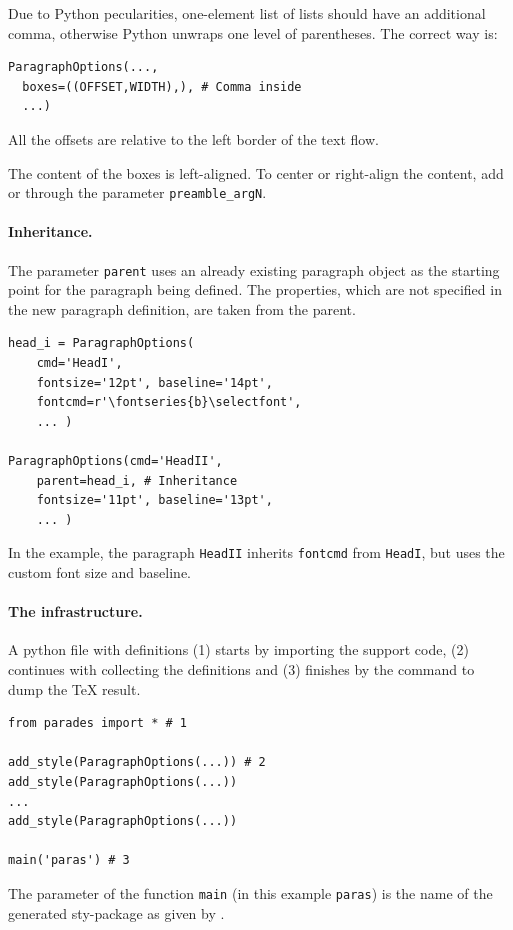 \documentclass[]{ltugboat}
\begin{document}
Due to Python pecularities, one-element list of lists should have an additional comma, otherwise Python unwraps one level of parentheses. The correct way is:

\begin{verbatim}
ParagraphOptions(...,
  boxes=((OFFSET,WIDTH),), # Comma inside
  ...)
\end{verbatim}

All the offsets are relative to the left border of the text flow.

The content of the boxes is left-aligned. To center or right-align the content, add  or  through the parameter \verb|preamble_argN|.

\paragraph{Inheritance.} The parameter \verb|parent| uses an already existing paragraph object as the starting point for the paragraph being defined. The properties, which are not specified in the new paragraph definition, are taken from the parent.

\begin{verbatim}
head_i = ParagraphOptions(
    cmd='HeadI',
    fontsize='12pt', baseline='14pt',
    fontcmd=r'\fontseries{b}\selectfont',
    ... )

ParagraphOptions(cmd='HeadII',
    parent=head_i, # Inheritance
    fontsize='11pt', baseline='13pt',
    ... )
\end{verbatim}

In the example, the paragraph \verb|HeadII| inherits \verb|fontcmd| from \verb|HeadI|, but uses the custom font size and baseline.

\paragraph{The infrastructure.} A python file with definitions (1) starts by importing the support code, (2) continues with collecting the definitions and (3) finishes by the command to dump the \TeX{} result.

\begin{verbatim}
from parades import * # 1

add_style(ParagraphOptions(...)) # 2
add_style(ParagraphOptions(...))
...
add_style(ParagraphOptions(...))

main('paras') # 3
\end{verbatim}

The parameter of the function \verb|main| (in this example \verb|paras|) is the name of the generated sty-package as given by .
\end{document}
